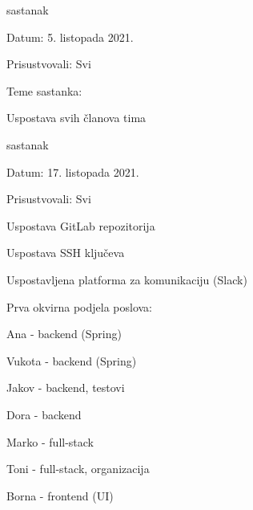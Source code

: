 		\begin{packed_enum}
			\item  sastanak
			
			\item[] \begin{packed_item}
				\item Datum: 5. listopada 2021.
				\item Prisustvovali: Svi
				\item Teme sastanka:
				\begin{packed_item}
                    \item Uspostava svih članova tima
                \end{packed_item}
			\end{packed_item}
			
			\bigskip
			\item  sastanak
			\item[] \begin{packed_item}
				\item Datum: 17. listopada 2021.
				\item Prisustvovali: Svi
				\item Uspostava GitLab repozitorija
				\item Uspostava SSH ključeva
				\item Uspostavljena platforma za komunikaciju (Slack)
				\item Prva okvirna podjela poslova:
				\item[] \begin{packed_item}
					\item Ana - backend (Spring)
		            \item Vukota - backend (Spring)
		            \item Jakov - backend, testovi
		            \item Dora - backend
		            \item Marko - full-stack
		            \item Toni - full-stack, organizacija
		            \item Borna - frontend (UI)
				\end{packed_item}
				

\end{packed_item}
\end{packed_enum}
